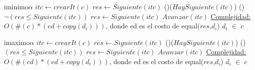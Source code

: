 \begin{Algoritmos}

\begin{algoritmo}{iminimo}{}{$\alpha$}
	$itc \gets crearIt(c)$ 
    $res \gets Siguiente(itc)$ 
    \While(){($HaySiguiente(itc)$)}{
    	\If(){$\neg (res \leq Siguiente(itc))$}{
			$res \gets Siguiente(itc)$ 
		}
     	$Avanzar(itc)$ 
	}
    \medskip
	\underline{Complejidad:} $O(\#(c)*(ed + copy(d_i)))$, donde ed es el costo de equal($res$,$d_i$) $d_i$ $\in$ $c$
\end{algoritmo} 

\begin{algoritmo}{imaximo}{}{$\alpha$}
	$itc \gets crearIt(c)$ 
    $res \gets Siguiente(itc)$ 
    \While(){($HaySiguiente(itc)$)}{
    	\If(){$(res \leq Siguiente(itc))$}{
			$res \gets Siguiente(itc)$ 
		}
     	$Avanzar(itc)$ 
	}
    \medskip
	\underline{Complejidad:} $O(\#(cd)*(ed + copy(d_i)))$, donde ed es el costo de equal($res$,$d_i$) $d_i$ $\in$ $c$
\end{algoritmo} 



\end{Algoritmos}

